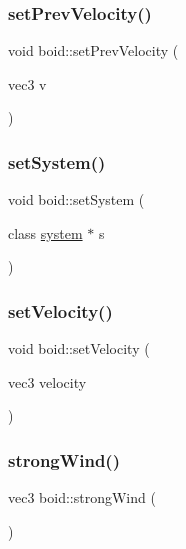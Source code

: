\mbox{\label{classboid_a61aff8ed86684833832d1417a7c24346}} 
\subsubsection{\texorpdfstring{set\+Prev\+Velocity()}{setPrevVelocity()}}
{\footnotesize\ttfamily void boid\+::set\+Prev\+Velocity (\begin{DoxyParamCaption}\item[{vec3}]{v }\end{DoxyParamCaption})}

\mbox{\label{classboid_a80894b58a6f76451d4e999b3852f9f63}} 
\subsubsection{\texorpdfstring{set\+System()}{setSystem()}}
{\footnotesize\ttfamily void boid\+::set\+System (\begin{DoxyParamCaption}\item[{class \mbox{\hyperlink{classsystem}{system}} $\ast$}]{s }\end{DoxyParamCaption})}

\mbox{\label{classboid_ac4e66a9e65ea2e7362f6ac7af2f4fe64}} 
\subsubsection{\texorpdfstring{set\+Velocity()}{setVelocity()}}
{\footnotesize\ttfamily void boid\+::set\+Velocity (\begin{DoxyParamCaption}\item[{vec3}]{velocity }\end{DoxyParamCaption})}

\mbox{\label{classboid_abf305f09cde8ce66b82a7a671fdcd744}} 
\subsubsection{\texorpdfstring{strong\+Wind()}{strongWind()}}
{\footnotesize\ttfamily vec3 boid\+::strong\+Wind (\begin{DoxyParamCaption}{ }\end{DoxyParamCaption})}

